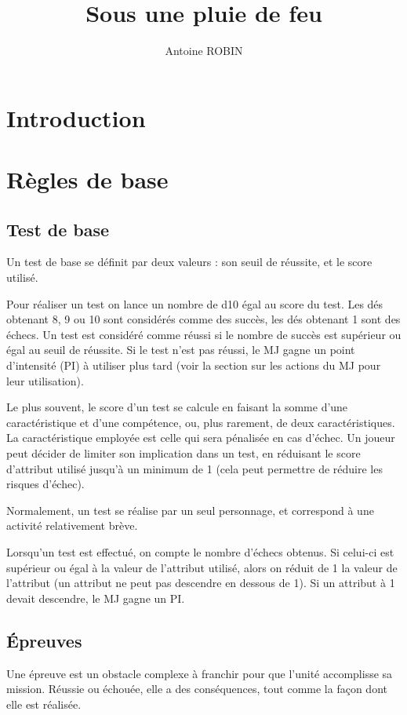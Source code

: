 \documentclass[twocolumn]{report}
\title{Sous une pluie de feu}
\author{Antoine ROBIN }
\date{}
\begin{document}
\maketitle
\tableofcontents
\chapter*{Introduction}

\chapter{Règles de base}
\section{Test de base}
Un test de base se définit par deux valeurs : son seuil de réussite, et le score utilisé.

Pour réaliser un test on lance un nombre de d10 égal au score du test. Les dés obtenant 8, 9 ou 10 sont considérés comme des succès, les dés obtenant 1 sont des échecs. Un test est considéré comme réussi si le nombre de succès est supérieur ou égal au seuil de réussite. Si le test n'est pas réussi, le MJ gagne un point d'intensité (PI) à utiliser plus tard (voir la section sur les actions du MJ pour leur utilisation).

Le plus souvent, le score d'un test se calcule en faisant la somme d'une caractéristique et d'une compétence, ou, plus rarement, de deux caractéristiques. La caractéristique employée est celle qui sera pénalisée en cas d'échec. Un joueur peut décider de limiter son implication dans un test, en réduisant le score d'attribut utilisé jusqu'à un minimum de 1 (cela peut permettre de réduire les risques d'échec).

Normalement, un test se réalise par un seul personnage, et correspond à une activité relativement brève.

Lorsqu'un test est effectué, on compte le nombre d'échecs obtenus. Si celui-ci est supérieur ou égal à la valeur de l'attribut utilisé, alors on réduit de 1 la valeur de l'attribut (un attribut ne peut pas descendre en dessous de 1). Si un attribut à 1 devait descendre, le MJ gagne un PI.

\section{Épreuves}
Une épreuve est un obstacle complexe à franchir pour que l'unité accomplisse sa mission. Réussie ou échouée, elle a des conséquences, tout comme la façon dont elle est réalisée.
\end{document}
